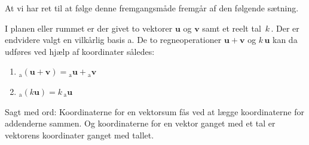 At vi har ret til at følge denne fremgangsmåde fremgår af den følgende sætning.

\begin{theorem}\label{tn6.koord_linearitet}
I planen eller rummet er der givet to vektorer $\mathbf u$ og $\mathbf v$ samt et reelt tal $\,k\,$. Der er endvidere valgt en vilkårlig basis a. De to regneoperationer $\mathbf u + \mathbf v$ og $k\,\mathbf u$ kan da udføres ved hjælp af koordinater således:
\begin{enumerate}
\item
$_\mathrm a(\mathbf u+\mathbf v)={_\mathrm{a}\mathbf{u}}+{_\mathrm a\mathbf v}$
\item
$_\mathrm a(k\mathbf u)=k\,_\mathrm a\mathbf u$
\end{enumerate}

Sagt med ord: Koordinaterne for en vektorsum fås ved at lægge koordinaterne for addenderne sammen. Og koordinaterne for en vektor ganget med et tal er vektorens koordinater ganget med tallet. 
\end{theorem}\label{tn6.koordinater}
